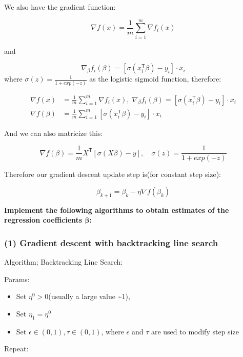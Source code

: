 \documentclass[
  letterpaper,
  DIV=11,
  numbers=noendperiod]{scrartcl}
\providecommand{\tightlist}{%
  \setlength{\itemsep}{0pt}\setlength{\parskip}{0pt}}\usepackage{longtable,booktabs,array}
\begin{document}
We also have the gradient function:

\[
\nabla f(x) = \frac{1}{m} \sum_{i=1}^m \nabla f_i(x)
\]

and

\[
\nabla_\beta f_i(\beta) = [\sigma(x_i^{\mathsf{T}} \beta) - y_i] \cdot x_i
\] where \(\sigma(z) = \frac{1}{1+exp(-z)}\) as the logistic sigmoid
function, therefore:

\[
\begin{aligned}
\nabla f(x) &= \frac{1}{m} \sum_{i=1}^m \nabla f_i(x), \; \nabla_\beta f_i(\beta) = [\sigma(x_i^{\mathsf{T}} \beta) - y_i] \cdot x_i \\
\nabla f(\beta) &= {\frac{1}{m} \sum_{i=1}^m [\sigma(x_i^{\mathsf{T}} \beta) - y_i] \cdot x_i}
\end{aligned}
\]

And we can also matricize this:

\[
\boxed{\nabla f(\beta) = \frac{1}{m} X^{\mathsf{T}}[\sigma(X\beta) - y], \quad \sigma(z) = \frac{1}{1+exp(-z)}}
\]

Therefore our gradient descent update step is(for constant step size):

\[
\boxed {\beta_{k+1} = \beta_k - \eta \nabla f(\beta_k)}
\]

\textbf{Implement the following algorithms to obtain estimates of the
regression coefficients \(\symbf{β}\):}

\subsubsection{(1) Gradient descent with backtracking line
search}\label{gradient-descent-with-backtracking-line-search}

Algorithm; Backtracking Line Search:

Params:

\begin{itemize}
\tightlist
\item
  Set \(η^0 > 0\)(usually a large value \textasciitilde1),
\item
  Set \(η_1 = η^0\)
\item
  Set \(ϵ ∈ (0,1), τ ∈ (0,1)\), where \(ϵ\) and \(τ\) are used to modify
  step size
\end{itemize}

Repeat:
\end{document}

